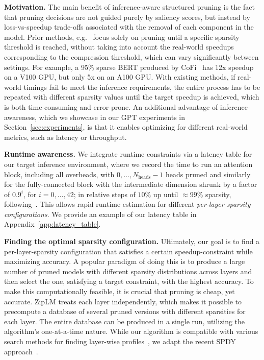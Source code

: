 \documentclass{article}
\theoremstyle{plain}
\theoremstyle{definition}
\theoremstyle{remark}
\renewcommand{\paragraph}[1]{ \noindent \textbf{#1}}
\begin{document}
\paragraph{Motivation.} The main benefit of inference-aware structured pruning is the fact that pruning decisions are not guided purely by saliency scores, but instead by loss-vs-speedup trade-offs associated with the removal of each component in the model. Prior methods, e.g.~\cite{obert, lagunas21block, xia2022structured} focus solely on pruning until a specific sparsity threshold is reached, 
without taking into account the real-world speedups corresponding to the compression threshold, which can vary significantly between settings. 
For example, a 95\% sparse BERT produced by CoFi~\cite{xia2022structured} has 12x speedup on a V100 GPU, 
but only 5x on an A100 GPU. With existing methods, if real-world timings fail to meet the inference requirements, the entire process has to be repeated with different sparsity values until the target speedup is achieved, which is both time-consuming and error-prone. 
An additional advantage of inference-awareness, which we showcase in our GPT experiments in Section~\ref{sec:experiments}, is that it enables optimizing for different real-world metrics, such as latency or throughput.  

\paragraph{Runtime awareness.} We integrate runtime constraints via a latency table \cite{cai2019once} for our target inference environment, where we record the time to run an attention block, including all \mbox{overheads}, with $0, \dots, N_\text{heads} - 1$ heads pruned and similarly for the fully-connected block with the intermediate dimension shrunk by a factor of $0.9^i$, for $i = 0, \dots, 42$; in relative steps of $10\%$ up until $\approx99\%$ sparsity, following~\cite{frantar2022spdy}. This allows rapid runtime estimation for different \textit{per-layer sparsity configurations}. We provide an example of our latency table in Appendix~\ref{app:latency_table}. 

\paragraph{Finding the optimal sparsity configuration.} Ultimately, our goal is to find a per-layer-sparsity configuration that satisfies a certain speedup-constraint while maximizing accuracy. A popular paradigm of doing this \cite{he2018amc, li2022revisiting} is to produce a large number of pruned models with different sparsity distributions across layers and then select the one, satisfying a target constraint, with the highest accuracy. To make this computationally feasible, it is crucial that pruning is cheap, yet accurate. ZipLM treats each layer independently, which makes it possible to precompute a database of several pruned versions with different sparsities for each layer. The entire database can be produced in a single run, utilizing the algorithm's one-at-a-time nature. While our algorithm is compatible with various search methods for finding layer-wise profiles~\cite{he2018amc, guo2020single}, we adapt the recent SPDY approach~\cite{frantar2022spdy}. 
\end{document}

